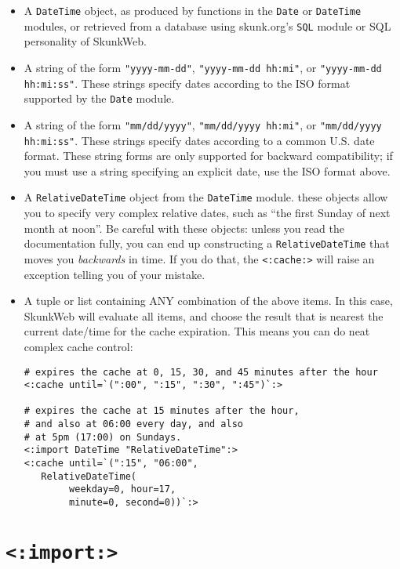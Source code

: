 \documentclass{manual}
\begin{document}
{{\begin{itemize}
\item A \texttt{DateTime} object, as produced by functions in the
\texttt{Date} or \texttt{DateTime} modules, or retrieved
from a database using skunk.org's \texttt{SQL} module
or SQL personality of SkunkWeb.

\item A string of the form \texttt{"yyyy-mm-dd"},
\texttt{"yyyy-mm-dd hh:mi"}, or \texttt{"yyyy-mm-dd hh:mi:ss"}.
These strings specify dates according to the ISO 
format supported by the \texttt{Date} module.

\item A string of the form \texttt{"mm/dd/yyyy"},
\texttt{"mm/dd/yyyy hh:mi"}, or \texttt{"mm/dd/yyyy hh:mi:ss"}.
These strings specify dates according to a common
U.S. date format. These string forms are only supported
for backward compatibility; if you must use a string
specifying an explicit date, use the ISO format above.

\item A \texttt{RelativeDateTime} object from the \texttt{DateTime}
module. these objects allow you to specify very complex
relative dates, such as ``the first Sunday of next month
at noon''. Be careful with these objects: unless you
read the documentation fully, you can end up constructing
a \texttt{RelativeDateTime} that moves you \emph{backwards} in time.
If you do that, the \texttt{<:cache:>} will raise
an exception telling you of your mistake.

\item A tuple or list containing ANY combination of the above
items. In this case, SkunkWeb will evaluate all items, and choose
the result that is nearest the current date/time for 
the cache expiration. This means you can do neat complex
cache control:

\begin{verbatim}# expires the cache at 0, 15, 30, and 45 minutes after the hour
<:cache until=`(":00", ":15", ":30", ":45")`:>

# expires the cache at 15 minutes after the hour,
# and also at 06:00 every day, and also
# at 5pm (17:00) on Sundays.
<:import DateTime "RelativeDateTime":>
<:cache until=`(":15", "06:00", 
   RelativeDateTime(
        weekday=0, hour=17, 
        minute=0, second=0))`:>

\end{verbatim}
\end{itemize}




\section{\texttt{<:import:>}}
\label{tagimport}

}}
\end{document}
